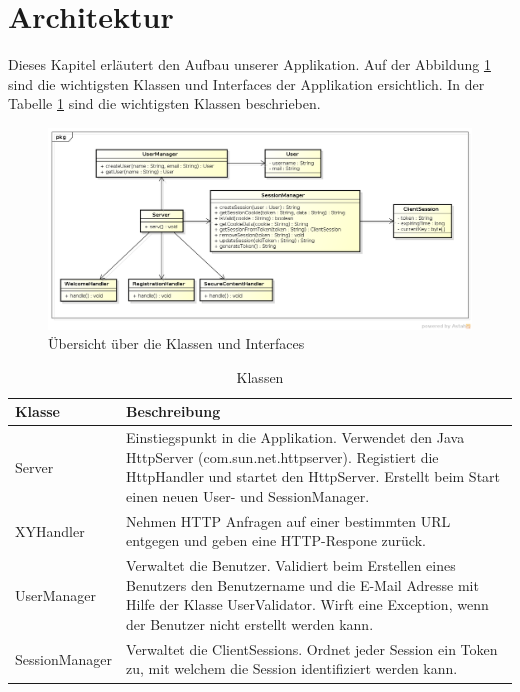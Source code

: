 \section{Architektur}

Dieses Kapitel erläutert den Aufbau unserer Applikation.
Auf der Abbildung \ref{fig:overview} sind die wichtigsten Klassen und Interfaces der Applikation ersichtlich. In der Tabelle \ref{tab:class} sind
die wichtigsten Klassen beschrieben.

\begin{figure}[ht]
	\begin{center}
		\includegraphics[width=1.0\textwidth]{./content/Class_Overview.png}
	\end{center}
	\caption{Übersicht über die Klassen und Interfaces}
	\label{fig:overview}
\end{figure}

\begin{table}[H]
\begin{center}
\begin{tabular}{l p{10.5cm} }
\hline
\textbf{Klasse} & \textbf{Beschreibung} \\ \hline \hline
Server      & Einstiegspunkt in die Applikation. Verwendet den Java HttpServer (com.sun.net.httpserver). Registiert die HttpHandler und startet den HttpServer. 
              Erstellt beim Start einen neuen User- und SessionManager. \\
XYHandler   & Nehmen HTTP Anfragen auf einer bestimmten URL entgegen und geben eine HTTP-Respone zurück. \\
UserManager & Verwaltet die Benutzer. Validiert beim Erstellen eines Benutzers den Benutzername und die E-Mail Adresse mit Hilfe der Klasse UserValidator.
              Wirft eine Exception, wenn der Benutzer nicht erstellt werden kann. \\
SessionManager & Verwaltet die ClientSessions. Ordnet jeder Session ein Token zu, mit welchem die Session identifiziert werden kann. \\
\hline \hline
\end{tabular}
\caption{Klassen}
\label{tab:class}
\end{center}
\end{table}

